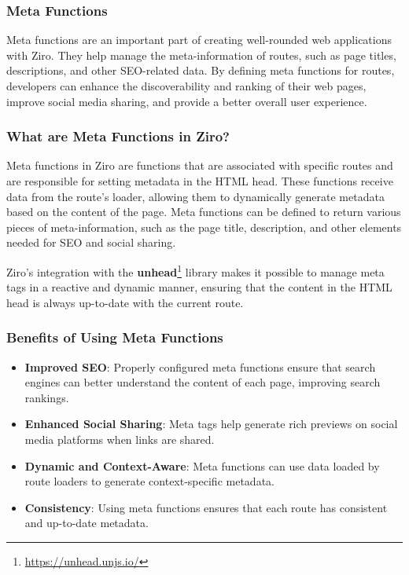 \subsubsection{Meta Functions}
Meta functions are an important part of creating well-rounded web applications with Ziro. They help manage the meta-information of routes, such as page titles, descriptions, and other SEO-related data. By defining meta functions for routes, developers can enhance the discoverability and ranking of their web pages, improve social media sharing, and provide a better overall user experience.

\subsubsection*{What are Meta Functions in Ziro?}
Meta functions in Ziro are functions that are associated with specific routes and are responsible for setting metadata in the HTML head. These functions receive data from the route’s loader, allowing them to dynamically generate metadata based on the content of the page. Meta functions can be defined to return various pieces of meta-information, such as the page title, description, and other elements needed for SEO and social sharing.

Ziro’s integration with the \textbf{unhead}\footnote{\url{https://unhead.unjs.io/}} library makes it possible to manage meta tags in a reactive and dynamic manner, ensuring that the content in the HTML head is always up-to-date with the current route.


\subsubsection*{Benefits of Using Meta Functions}
\begin{itemize}
  \item \textbf{Improved SEO}: Properly configured meta functions ensure that search engines can better understand the content of each page, improving search rankings.

  \item \textbf{Enhanced Social Sharing}: Meta tags help generate rich previews on social media platforms when links are shared.

  \item \textbf{Dynamic and Context-Aware}: Meta functions can use data loaded by route loaders to generate context-specific metadata.

  \item \textbf{Consistency}: Using meta functions ensures that each route has consistent and up-to-date metadata.
\end{itemize}


